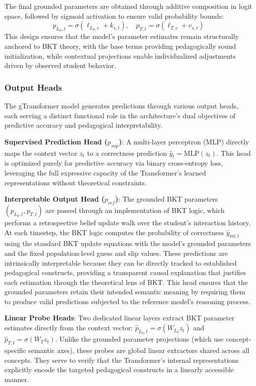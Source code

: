 \documentclass[applsci,article,submit,moreauthors,pdftex]{Definitions/mdpi}
\begin{document}
The final grounded parameters are obtained through additive composition in logit space, followed by sigmoid activation to ensure valid probability bounds:
\begin{equation} \label{eq:grounded_params}
    p_{L_0,t} = \sigma(\ell_{L_0,c} + k_{s,t}), \quad p_{T,t} = \sigma(\ell_{T,c} + v_{s,t})
\end{equation}
This design ensures that the model's parameter estimates remain structurally anchored to BKT theory, with the base terms providing pedagogically sound initialization, while contextual projections enable individualized adjustments driven by observed student behavior.

\subsubsection{Output Heads} \label{sec_output_heads}

The gTransformer model generates predictions through various output heads, each serving a distinct functional role in the architecture's dual objectives of predictive accuracy and pedagogical interpretability.

\textbf{Supervised Prediction Head ($p_{sup}$)}: A multi-layer perceptron (MLP) directly maps the context vector $z_t$ to a correctness prediction $\hat{y}_t = \text{MLP}(z_t)$. This head is optimized purely for predictive accuracy via binary cross-entropy loss, leveraging the full expressive capacity of the Transformer's learned representations without theoretical constraints.


\textbf{Interpretable Output Head ($p_{ref}$)}: The grounded BKT parameters $(p_{L_0,t}, p_{T,t})$ are passed through an implementation of BKT logic, which performs a retrospective belief update walk over the student's interaction history. At each timestep, the BKT logic computes the probability of correctness $\hat{y}_{\text{ref},t}$ using the standard BKT update equations with the model's grounded parameters and the fixed population-level guess and slip values. These predictions are intrinsically interpretable because they can be directly tracked to established pedagogical constructs, providing a transparent causal explanation that justifies each estimation through the theoretical lens of BKT. This head ensures that the grounded parameters retain their intended semantic meaning by requiring them to produce valid predictions subjected to the reference model's reasoning process.

\textbf{Linear Probe Heads}: Two dedicated linear layers extract BKT parameter estimates directly from the context vector: $\hat{p}_{L_0,t} = \sigma(W_{L_0} z_t)$ and $\hat{p}_{T,t} = \sigma(W_{T} z_t)$. Unlike the grounded parameter projections (which use concept-specific semantic axes), these probes are global linear extractors shared across all concepts. They serve to verify that the Transformer's internal representations explicitly encode the targeted pedagogical constructs in a linearly accessible manner.
\end{document}
